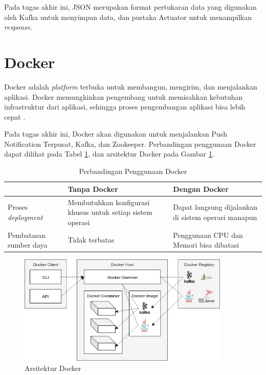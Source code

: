 \par Pada tugas akhir ini, JSON merupakan format pertukaran data yang digunakan oleh Kafka untuk menyimpan data, dan pustaka Actuator untuk menampilkan \textit{response}.

\section{Docker}
\par Docker adalah \textit{platform} terbuka untuk membangun, mengirim, dan menjalankan aplikasi. Docker memungkinkan pengembang untuk memisahkan kebutuhan infrastruktur dari aplikasi, sehingga proses pengembangan aplikasi bisa lebih cepat \cite{docker-online}.
\par Pada tugas akhir ini, Docker akan digunakan untuk menjalankan Push Notification Terpusat, Kafka, dan Zookeeper. Perbandingan penggunaan Docker dapat dilihat pada Tabel \ref{t:perbandingan_docker}, dan arsitektur Docker pada Gambar \ref{img:arsitektur-docker}.
\begin{longtable}{|p{2.5cm}|p{3.5cm}|p{3.5cm}|}
	\caption{Perbandingan Penggunaan Docker} \label{t:perbandingan_docker} \\ \hline
	\rowcolor{lightgray} & Tanpa Docker & Dengan Docker \\ \hline
	Proses \textit{deployment} & Membutuhkan konfigurasi khusus untuk setiap sistem operasi & Dapat langsung dijalankan di sistem operasi manapun \\ \hline
	Pembatasan sumber daya & Tidak terbatas & Penggunaan CPU dan Memori bisa dibatasi \\ \hline
\end{longtable}
\begin{figure}[H]
\centering\includegraphics[width=0.9\textwidth]{bab2/img/arsitektur-docker.jpg}
\caption{Arsitektur Docker}
\label{img:arsitektur-docker}
\end{figure}


